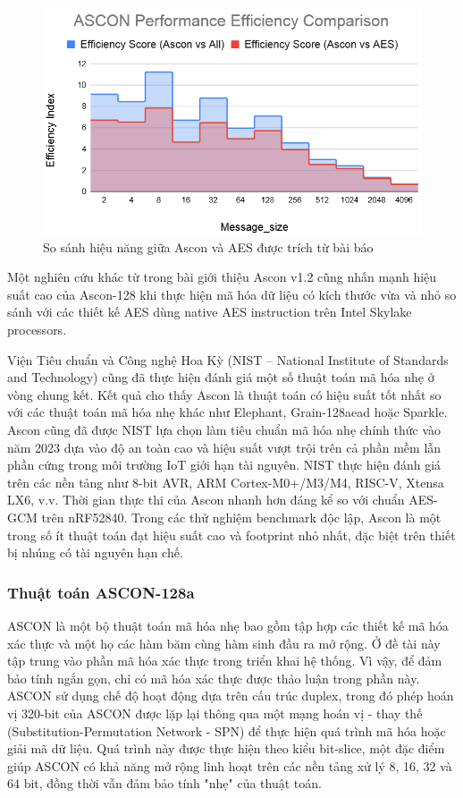 \begin{figure}[h]
    \centering
    \includegraphics[width=0.7\linewidth]{ascon-aes.png}
    \caption{So sánh hiệu năng giữa Ascon và AES được trích từ bài báo}
    \label{fig:ascon-aes}
\end{figure}

Một nghiên cứu khác từ \cite{asconv1.2} trong bài giới thiệu Ascon v1.2 cũng nhấn mạnh hiệu suất cao của Ascon-128 khi thực hiện mã hóa dữ liệu có kích thước vừa và nhỏ so sánh với các thiết kế AES dùng native AES instruction trên Intel Skylake processors. 

Viện Tiêu chuẩn và Công nghệ Hoa Kỳ (NIST -- National Institute of Standards and Technology) cũng đã thực hiện đánh giá một số thuật toán mã hóa nhẹ ở vòng chung kết. Kết quả cho thấy Ascon là thuật toán có hiệu suất tốt nhất so với các thuật toán mã hóa nhẹ khác như Elephant, Grain-128aead hoặc Sparkle. Ascon cũng đã được NIST lựa chọn làm tiêu chuẩn mã hóa nhẹ chính thức vào năm 2023 dựa vào độ an toàn cao và hiệu suất vượt trội trên cả phần mềm lẫn phần cứng trong môi trường IoT giới hạn tài nguyên. NIST thực hiện đánh giá trên các nền tảng như 8-bit AVR, ARM Cortex-M0+/M3/M4, RISC-V, Xtensa LX6, v.v. Thời gian thực thi của Ascon nhanh hơn đáng kể so với chuẩn AES-GCM trên nRF52840. Trong các thử nghiệm benchmark độc lập, Ascon là một trong số ít thuật toán đạt hiệu suất cao và footprint nhỏ nhất, đặc biệt trên thiết bị nhúng có tài nguyên hạn chế.

\subsubsection{Thuật toán ASCON-128a}
ASCON là một bộ thuật toán mã hóa nhẹ bao gồm tập hợp các thiết kế mã hóa xác thực và một họ các hàm băm cùng hàm sinh đầu ra mở rộng. Ở đề tài này tập trung vào phần mã hóa xác thực trong triển khai hệ thống. Vì vậy, để đảm bảo tính ngắn gọn, chỉ có mã hóa xác thực được thảo luận trong phần này. ASCON sử dụng chế độ hoạt động dựa trên cấu trúc duplex, trong đó phép hoán vị 320-bit của ASCON được lặp lại thông qua một mạng hoán vị - thay thế (Substitution-Permutation Network - SPN) để thực hiện quá trình mã hóa hoặc giải mã dữ liệu. Quá trình này được thực hiện theo kiểu bit-slice, một đặc điểm giúp ASCON có khả năng mở rộng linh hoạt trên các nền tảng xử lý 8, 16, 32 và 64 bit, đồng thời vẫn đảm bảo tính "nhẹ" của thuật toán.

